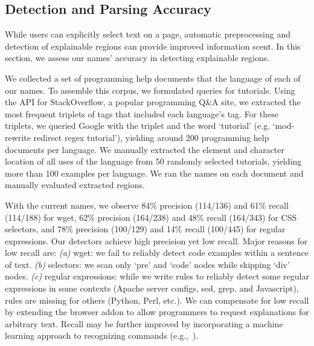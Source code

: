 \subsection{Detection and Parsing Accuracy}
\begin{changes}
While users can explicitly select text on a page, automatic preprocessing and detection of explainable regions can provide improved information scent.
In this section, we assess our \Glspl{name}' accuracy in detecting explainable regions.

We collected a set of programming help documents that the language of each of our \Glspl{name}. 
To assemble this corpus, we formulated queries for tutorials.
Using the API for StackOverflow, a popular programming Q\&A site, we extracted the most frequent triplets of tags that included each language's tag.
For these triplets, we queried Google with the triplet and the word `tutorial' (e.g. `mod-rewrite redirect regex tutorial'), yielding around 200 programming help documents per language. %
We manually extracted the element and character location of all uses of the language from 50 randomly selected tutorials, yielding more than 100 examples per language.   We ran the \Glspl{name} on each document and manually evaluated extracted regions.  

With the current \Glspl{name}, we observe 84\% precision (114/136) and 61\% recall (114/188) for wget, 62\% precision (164/238) and 48\% recall (164/343) for CSS selectors, and 78\% precision (100/129) and 14\% recall (100/445) for regular expressions.
Our detectors achieve high precision yet low recall.
Major reasons for low recall are:
\emph{(a)} wget: we fail to reliably detect code examples within a sentence of text.
\emph{(b)} selectors: we scan only `pre' and `code' nodes while skipping `div' nodes.
\emph{(c)} regular expressions: while we write rules to reliably detect some regular expressions in some contexts (Apache server configs, sed, grep, and Javascript), rules are missing for others (Python, Perl, etc.).
We can compensate for low recall by extending the browser addon to allow programmers to request explanations for arbitrary text.
Recall may be further improved by incorporating a machine learning approach to recognizing commands (e.g.,~\cite{pavel_browsing_2013}).


\end{changes}
